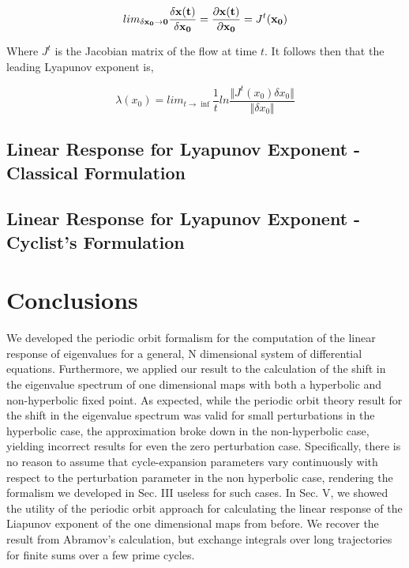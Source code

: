 \documentclass[twocolumn,aip,cha]{revtex4-1}
\begin{document}
\begin{equation}
lim_{\bf \delta x_{0} \rightarrow 0} \frac{\bf \delta x(t)}{\bf \delta x_{0}} = \frac{\bf \partial x(t)}{\bf \partial x_{0}} = J^{t}(\bf x_{0})
\end{equation}

Where $J^{t}$ is the Jacobian matrix of the flow at time $t$. It follows then that the leading Lyapunov exponent is,

\begin{equation}
\lambda(\textbf{$x_{0}$}) = lim_{t\rightarrow \inf}\frac{1}{t} ln \frac{\Vert J^{t}(\textbf{$x_{0}$}) \textbf{$\delta x_{0}$} \Vert}{\Vert \textbf{$\delta x_{0}$} \Vert}
\end{equation}

\subsection{Linear Response for Lyapunov Exponent - Classical Formulation}

\subsection{Linear Response for Lyapunov Exponent - Cyclist's Formulation}
\section{Conclusions}
We developed the periodic orbit formalism for the computation of the linear response of eigenvalues for a general, N dimensional system of differential equations. Furthermore, we applied our result to the calculation of the shift in the eigenvalue spectrum of one dimensional maps with both a hyperbolic and non-hyperbolic fixed point. As expected, while the periodic orbit theory result for the shift in the eigenvalue spectrum was valid for small perturbations in the hyperbolic case, the approximation broke down in the non-hyperbolic case, yielding incorrect results for even the zero perturbation case. Specifically, there is no reason to assume that cycle-expansion parameters vary continuously with respect to the perturbation parameter in the non hyperbolic case, rendering the formalism we developed in Sec. III useless for such cases.
\indent In Sec. V, we showed the utility of the periodic orbit approach for calculating the linear response of the Liapunov exponent of the one dimensional maps from before. We recover the result from Abramov's calculation, but exchange integrals over long trajectories for finite sums over a few prime cycles.
\end{document}
